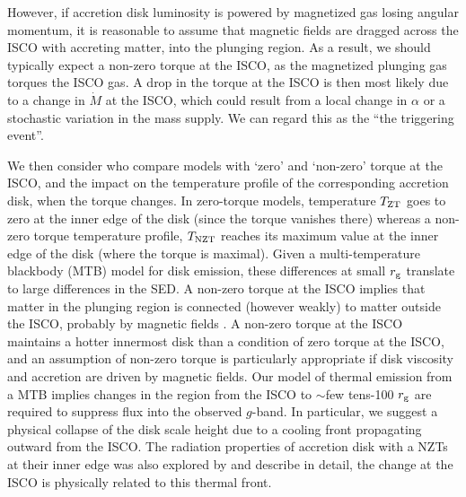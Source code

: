 \documentclass[a4paper,fleqn,usenatbib]{mnras}
\begin{document}
However, if accretion disk luminosity is powered by magnetized gas
losing angular momentum, it is reasonable to assume that magnetic
fields are dragged across the ISCO with accreting matter, into the
plunging region. As a result, we should typically expect a non-zero
torque at the ISCO, as the magnetized plunging gas torques the ISCO
gas. A drop in the torque at the ISCO is then most likely due to a
change in $\dot{M}$ at the ISCO, which could result from a local
change in $\alpha$ or a stochastic variation in the mass supply. We
can regard this as the ``the triggering event''.

We then consider \citet{Zimmerman2005} who compare models with `zero'
and `non-zero' torque at the ISCO, and the impact on the temperature
profile of the corresponding accretion disk, when the torque changes.
In zero-torque models, temperature $T_{\rm ZT}$ goes to zero at the
inner edge of the disk (since the torque vanishes there) whereas a
non-zero torque temperature profile, $T_{\rm NZT}$ reaches its maximum
value at the inner edge of the disk (where the torque is maximal).
Given a multi-temperature blackbody (MTB) model for disk emission,
these differences at small $r_{\rm g}$ translate to large differences
in the SED.  A non-zero torque at the ISCO implies that matter in the
plunging region is connected (however weakly) to matter outside the
ISCO, probably by magnetic fields \citet[e.g., ][]{Gammie1999,
Agol_Krolik2000}. A non-zero torque at the ISCO maintains a hotter
innermost disk than a condition of zero torque at the ISCO, and an
assumption of non-zero torque is particularly appropriate if disk
viscosity and accretion are driven by magnetic fields. Our model of
thermal emission from a MTB implies changes in the region from the
ISCO to $\sim$few tens-100 $r_{\rm g}$ are required to suppress flux
into the observed $g$-band. In particular, we suggest a physical
collapse of the disk scale height due to a cooling front propagating
outward from the ISCO. The radiation properties of accretion disk with
a NZTs at their inner edge was also explored by \citet{Cao2003} and
\citet{Cannizzo1998b} describe in detail, the change at the ISCO is
physically related to this thermal front.
\end{document}
